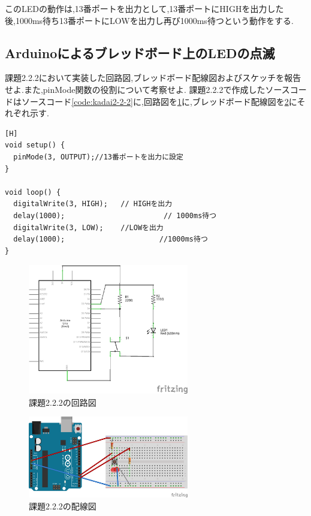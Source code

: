 \documentclass{jarticle}
\begin{document}
このLEDの動作は,13番ポートを出力として,13番ポートにHIGHを出力した後,1000ms待ち13番ポートにLOWを出力し再び1000ms待つという動作をする.

\subsection{Arduinoによるブレッドボード上のLEDの点滅}
課題2.2.2において実装した回路図,ブレッドボード配線図およびスケッチを報告せよ.また,pinMode関数の役割について考察せよ.
課題2.2.2で作成したソースコードはソースコード\ref{code:kadai2-2-2}に,回路図を\ref{fig:2-2-2kairo}に,ブレッドボード配線図を\ref{fig:2-2-2bread}にそれぞれ示す.

\begin{lstlisting}[caption = 課題2.2.2,label=code:kadai2-2-2][H]
void setup() {
  pinMode(3, OUTPUT);//13番ポートを出力に設定
}

void loop() {
  digitalWrite(3, HIGH);   // HIGHを出力
  delay(1000);                       // 1000ms待つ
  digitalWrite(3, LOW);    //LOWを出力
  delay(1000);                      //1000ms待つ
}
\end{lstlisting}

\begin{figure}[H]
\begin{center}
\includegraphics[width=7.0cm]{images/kadai2-2-2_kairo.png}
\caption{課題2.2.2の回路図}
\label{fig:2-2-2kairo}
\end{center}
\end{figure}

\begin{figure}[H]
\begin{center}
\includegraphics[width=7.0cm]{images/kadai2-2-2_bread.png}
\caption{課題2.2.2の配線図}
\label{fig:2-2-2bread}
\end{center}
\end{figure}
\end{document}
